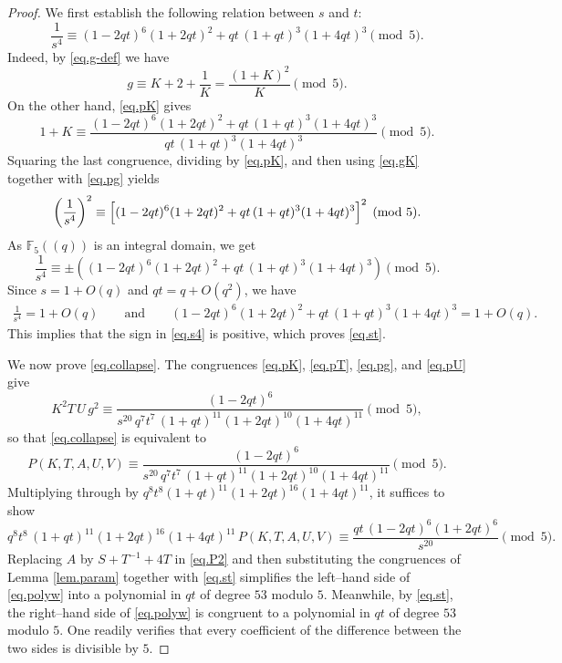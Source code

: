 \documentclass[10pt,a4paper]{amsart}
\begin{document}
\begin{proof}
We first establish the following relation between $s$ and $t$:
\begin{equation}\label{eq.st}
\frac1{s^{4}}\equiv(1-2qt)^{6}(1+2qt)^{2}+qt\,(1+qt)^{3}(1+4qt)^{3}\pmod 5 .
\end{equation}
Indeed, by \eqref{eq.g-def} we have
\begin{equation}\label{eq.gK}
	g\equiv K+2+\frac1K=\frac{(1+K)^{2}}{K}\pmod 5.
\end{equation}
On the other hand, \eqref{eq.pK} gives
\[
1+K\equiv\frac{(1-2qt)^{6}(1+2qt)^{2}+qt\,(1+qt)^{3}(1+4qt)^{3}}{qt\,(1+qt)^{3}(1+4qt)^{3}}\pmod 5.
\]
Squaring the last congruence, dividing by \eqref{eq.pK}, and then using \eqref{eq.gK} together with \eqref{eq.pg} yields
\[
\left(\frac1{s^{4}}\right)^2\equiv\Bigl[(1-2qt)^{6}(1+2qt)^{2}+qt\,(1+qt)^{3}(1+4qt)^{3}\Bigr]^{2}\pmod 5.
\]
As $\mathbb{F}_5((q))$ is an integral domain, we get
\begin{equation}\label{eq.s4}
	\frac1{s^{4}}\equiv\pm\left((1-2qt)^{6}(1+2qt)^{2}+qt\,(1+qt)^{3}(1+4qt)^{3}\right)\pmod 5.
\end{equation}
Since $s=1+O(q)$ and $qt=q+O(q^{2})$, we have
\begin{align*}
	\frac1{s^{4}}=1+O(q)\qquad\text{and}\qquad
	(1-2qt)^{6}(1+2qt)^{2}+qt\,(1+qt)^{3}(1+4qt)^{3}=1+O(q).
\end{align*}
This implies that the sign in \eqref{eq.s4} is positive, which proves \eqref{eq.st}.  

We now prove \eqref{eq.collapse}.  The congruences \eqref{eq.pK}, \eqref{eq.pT}, \eqref{eq.pg}, and \eqref{eq.pU}  give
\[
K^{2}T\,U\,g^{2}\equiv\frac{(1-2qt)^{6}}{s^{20}\,q^{7}t^{7}\,(1+qt)^{11}(1+2qt)^{10}(1+4qt)^{11}}\pmod 5,
\]
so that \eqref{eq.collapse} is equivalent to
\[
P(K,T,A,U,V)\equiv\frac{(1-2qt)^{6}}{s^{20}\,q^{7}t^{7}\,(1+qt)^{11}(1+2qt)^{10}(1+4qt)^{11}}\pmod 5.
\]
Multiplying through by $q^{8}t^{8}(1+qt)^{11}(1+2qt)^{16}(1+4qt)^{11}$, it suffices to show
\begin{equation}\label{eq.polyw}
q^{8}t^{8}\,(1+qt)^{11}(1+2qt)^{16}(1+4qt)^{11}\,P(K,T,A,U,V)
\equiv \frac{qt\,(1-2qt)^{6}(1+2qt)^{6}}{s^{20}}\pmod 5.
\end{equation}
Replacing $A$ by $S+T^{-1}+4T$ in \eqref{eq.P2} and then substituting the congruences of Lemma \ref{lem.param} together with \eqref{eq.st} simplifies the left--hand side of \eqref{eq.polyw} into a polynomial in $qt$ of degree $53$ modulo $5$. Meanwhile, by \eqref{eq.st}, the right--hand side of \eqref{eq.polyw} is congruent to a polynomial in $qt$ of degree $53$ modulo $5$. One readily verifies that every coefficient of the difference between the two sides is divisible by $5$.
\end{proof}
\end{document}

